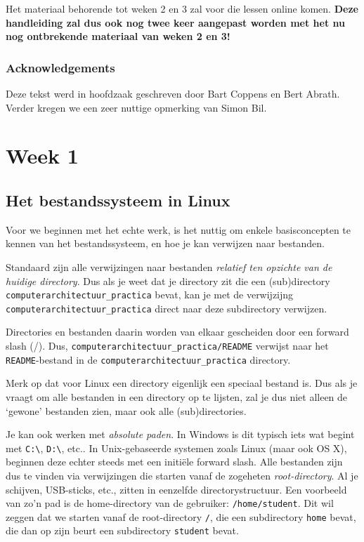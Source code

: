 \documentclass[a4paper,twoside,openany]{memoir}
\begin{document}
Het materiaal behorende tot weken 2 en 3 zal voor die lessen online komen.
\textbf{Deze handleiding zal dus ook nog twee keer aangepast worden met het nu
nog ontbrekende materiaal van weken 2 en 3!}

\section{Acknowledgements}
Deze tekst werd in hoofdzaak geschreven door Bart Coppens en Bert Abrath. Verder
kregen we een zeer nuttige opmerking van Simon Bil.

\part{Week 1}
\chapter{Het bestandssysteem in Linux}
Voor we beginnen met het echte werk, is het nuttig om enkele basisconcepten
te kennen van het bestandssysteem, en hoe je kan verwijzen naar bestanden.

Standaard zijn alle verwijzingen naar bestanden \emph{relatief ten opzichte van
de huidige directory}. Dus als je weet dat je directory zit die een
(sub)directory \verb!computerarchitectuur_practica! bevat, kan
je met de verwijzijng \verb!computerarchitectuur_practica! direct naar deze
subdirectory verwijzen.

Directories en bestanden daarin worden van elkaar gescheiden door een forward
slash (/). Dus, \verb!computerarchitectuur_practica/README! verwijst naar
het \verb!README!-bestand in de \verb!computerarchitectuur_practica! directory.

Merk op dat voor Linux een directory eigenlijk een speciaal bestand is. Dus
als je vraagt om alle bestanden in een directory op te lijsten, zal je dus
niet alleen de `gewone' bestanden zien, maar ook alle (sub)directories.

Je kan ook werken met \emph{absolute paden}. In Windows is dit typisch iets wat
begint met \verb!C:\!, \verb!D:\!, etc.. In Unix-gebaseerde systemen zoals
Linux (maar ook OS X),
beginnen deze echter steeds met een initiële forward slash. Alle bestanden zijn
dus te vinden via verwijzingen die starten vanaf de zogeheten
\emph{root-directory}. Al je schijven, USB-sticks, etc., zitten in eenzelfde
directorystructuur. Een voorbeeld van zo'n pad is de
home-directory van de gebruiker: \verb!/home/student!. Dit wil zeggen dat we starten vanaf de
root-directory \verb!/!, die een subdirectory \verb!home! bevat, die dan op zijn
beurt een subdirectory \verb!student! bevat.
\end{document}
